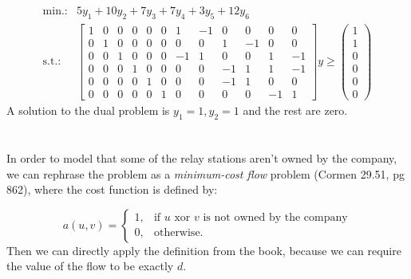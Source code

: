 \documentclass{article}
\begin{document}
\[
\begin{array}{cl}
\textrm{min.:} & 5y_1 + 10y_2 + 7y_3 + 7y_4 + 3y_5 + 12y_6\\
\textrm{s.t.:} &
 \begin{bmatrix}%
 1 & 0 & 0 & 0 & 0 & 0 & 1 & -1 & 0 & 0 & 0 & 0\\
 0 & 1 & 0 & 0 & 0 & 0 & 0 & 0 & 1 & -1 & 0 & 0\\
 0 & 0 & 1 & 0 & 0 & 0 & -1 & 1 & 0 & 0 & 1 & -1\\
 0 & 0 & 0 & 1 & 0 & 0 & 0 & 0 & -1 & 1 & 1 & -1\\
 0 & 0 & 0 & 0 & 1 & 0 & 0 & 0 & -1 & 1 & 0 & 0\\
 0 & 0 & 0 & 0 & 0 & 1 & 0 & 0 & 0 & 0 & -1 & 1
\end{bmatrix}y
\geq
\begin{pmatrix}
  1\\ 1\\ 0\\ 0\\ 0\\ 0
\end{pmatrix}
\end{array}
\]
A solution to the dual problem is $y_1 = 1, y_2 = 1$ and the rest are
zero.

\section*{\hfill}


In order to model that some of the relay stations aren't owned by
the company, we can rephrase the problem as a \emph{minimum-cost flow}
problem (Cormen 29.51, pg 862), where the cost function is defined by:

\[
a(u,v) = \left\{\begin{array}{ll}1,&\text{if $u$ xor $v$ is not owned
  by the company}\\ 0,&\text{otherwise.}\end{array}\right.
\]
Then we can directly apply the definition from the book, because we
can require the value of the flow to be exactly $d$.
\end{document}

